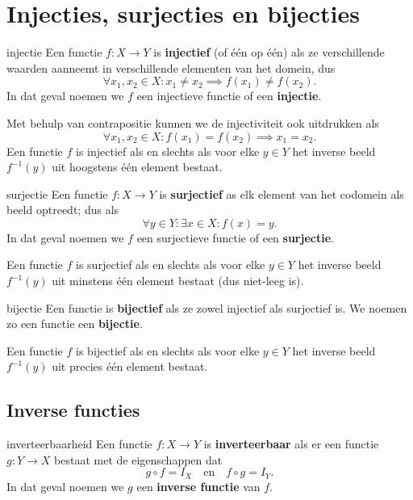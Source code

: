 \section{Injecties, surjecties en bijecties}
\begin{definitie}{}{injectie}
    Een functie $f: X \to Y$ is \textbf{injectief} (of één op één) als ze verschillende waarden aanneemt in verschillende elementen van het domein, dus
    \[
        \forall x_1, x_2 \in X: x_1 \neq x_2 \implies f(x_1) \neq f(x_2).
    \]
    In dat geval noemen we $f$ een injectieve functie of een \textbf{injectie}.
\end{definitie}
Met behulp van contrapositie kunnen we de injectiviteit ook uitdrukken als
\[
    \forall x_1, x_2 \in X: f(x_1) = f(x_2) \implies x_1 = x_2.
\]
Een functie $f$ is injectief als en slechts als voor elke $y \in Y$ het inverse beeld $f^{-1}(y)$ uit hoogstens één element bestaat.

\begin{definitie}{}{surjectie}
    Een functie $f: X \to Y$ is \textbf{surjectief} as elk element van het codomein als beeld optreedt; dus als
    \[
        \forall y \in Y: \exists x \in X: f(x) = y.
    \]
    In dat geval noemen we $f$ een surjectieve functie of een \textbf{surjectie}.
\end{definitie}
Een functie $f$ is surjectief als en slechts als voor elke $y \in Y$ het inverse beeld $f^{-1}(y)$ uit minstens één element bestaat (dus niet-leeg is).

\begin{definitie}{}{bijectie}
    Een functie is \textbf{bijectief} als ze zowel injectief als surjectief is.
    We noemen zo een functie een \textbf{bijectie}.
\end{definitie}
Een functie $f$ is bijectief als en slechts als voor elke $y \in Y$ het inverse beeld $f^{-1}(y)$ uit precies één element bestaat.


\subsection{Inverse functies}
\begin{definitie}{}{inverteerbaarheid}
    Een functie $f: X \to Y$ is \textbf{inverteerbaar} als er een functie $g: Y \to X$ bestaat met de eigenschappen dat
    \[
        g \circ f = I_X
        \quad \text{en} \quad
        f \circ g = I_Y.
    \]
    In dat geval noemen we $g$ een \textbf{inverse functie} van $f$.
\end{definitie}

